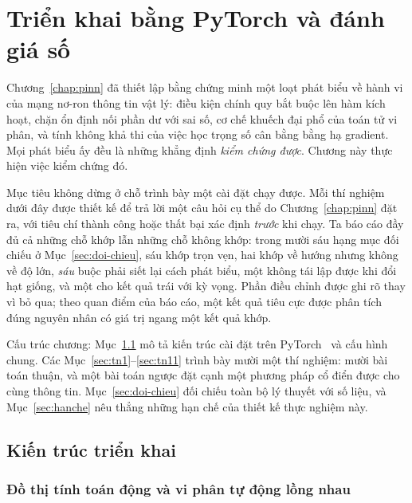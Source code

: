 \chapter{Triển khai bằng PyTorch và đánh giá số}
\label{chap:thucnghiem}
 
Chương~\ref{chap:pinn} đã thiết lập bằng chứng minh một loạt phát biểu về hành vi
của mạng nơ-ron thông tin vật lý: điều kiện chính quy bắt buộc lên hàm kích hoạt,
chặn ổn định nối phần dư với sai số, cơ chế khuếch đại phổ của toán tử vi phân, và
tính không khả thi của việc học trọng số cân bằng bằng hạ gradient. Mọi phát biểu
ấy đều là những khẳng định \emph{kiểm chứng được}. Chương này thực hiện việc kiểm
chứng đó.
 
Mục tiêu không dừng ở chỗ trình bày một cài đặt chạy được. Mỗi thí nghiệm dưới
đây được thiết kế để trả lời một câu hỏi cụ thể do Chương~\ref{chap:pinn} đặt ra,
với tiêu chí thành công hoặc thất bại xác định \emph{trước} khi chạy. Ta báo cáo
đầy đủ cả những chỗ khớp lẫn những chỗ không khớp: trong mười sáu hạng mục đối
chiếu ở Mục~\ref{sec:doi-chieu}, sáu khớp trọn vẹn, hai khớp về hướng nhưng
không về độ lớn, \emph{sáu} buộc phải siết lại cách phát biểu, một không tái lập
được khi đổi hạt giống, và một cho kết quả trái với kỳ vọng.
Phần điều chỉnh được ghi rõ thay vì bỏ qua; theo quan điểm của báo cáo, một kết
quả tiêu cực được phân tích đúng nguyên nhân có giá trị ngang một kết quả khớp.
 
Cấu trúc chương: Mục~\ref{sec:trienkhai} mô tả kiến trúc cài đặt trên
PyTorch~\cite{paszke2019} và cấu hình chung. Các
Mục~\ref{sec:tn1}--\ref{sec:tn11} trình bày mười một thí nghiệm: mười bài toán
thuận, và một bài toán ngược đặt cạnh một phương pháp cổ điển được cho cùng thông
tin.
Mục~\ref{sec:doi-chieu} đối chiếu toàn bộ lý thuyết với số liệu, và
Mục~\ref{sec:hanche} nêu thẳng những hạn chế của thiết kế thực nghiệm này.
 
\section{Kiến trúc triển khai}
\label{sec:trienkhai}
 
\subsection{Đồ thị tính toán động và vi phân tự động lồng nhau}
\label{ssec:ad-pytorch}
 
